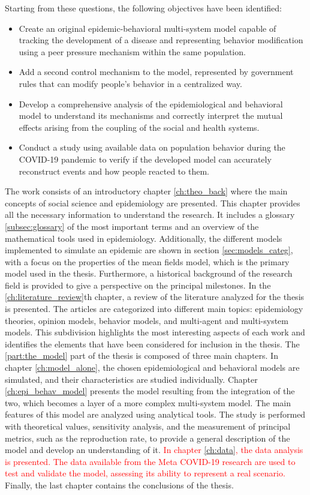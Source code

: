 Starting from these questions, the following objectives have been identified:
\begin{itemize}
	\item Create an original epidemic-behavioral multi-system model capable of tracking the development of a disease and representing behavior modification using a peer pressure mechanism within the same population.
	\item Add a second control mechanism to the model, represented by government rules that can modify people's behavior in a centralized way.
	\item Develop a comprehensive analysis of the epidemiological and behavioral model to understand its mechanisms and correctly interpret the mutual effects arising from the coupling of the social and health systems.
	\item Conduct a study using available data on population behavior during the COVID-19 pandemic to verify if the developed model can accurately reconstruct events and how people reacted to them.
\end{itemize}
The work consists of an introductory chapter \ref{ch:theo_back} where the main concepts of social science and epidemiology are presented. This chapter provides all the necessary information to understand the research. It includes a glossary \ref{subsec:glossary} of the most important terms and an overview of the mathematical tools used in epidemiology. Additionally, the different models implemented to simulate an epidemic are shown in section \ref{sec:models_categ}, with a focus on the properties of the mean fields model, which is the primary model used in the thesis. Furthermore, a historical background of the research field is provided to give a perspective on the principal milestones.
In the \ref{ch:literature_review}th chapter, a review of the literature analyzed for the thesis is presented. The articles are categorized into different main topics: epidemiology theories, opinion models, behavior models, and multi-agent and multi-system models. This subdivision highlights the most interesting aspects of each work and identifies the elements that have been considered for inclusion in the thesis.
The \ref{part:the_model} part of the thesis is composed of three main chapters. In chapter \ref{ch:model_alone}, the chosen epidemiological and behavioral models are simulated, and their characteristics are studied individually. Chapter \ref{ch:epi_behav_model} presents the model resulting from the integration of the two, which becomes a layer of a more complex multi-system model. The main features of this model are analyzed using analytical tools. The study is performed with theoretical values, sensitivity analysis, and the measurement of principal metrics, such as the reproduction rate, to provide a general description of the model and develop an understanding of it.
\textcolor{red}{In chapter \ref{ch:data}, the data analysis is presented. The data available from the Meta COVID-19 research are used to test and validate the model, assessing its ability to represent a real scenario.} Finally, the last chapter contains the conclusions of the thesis.
 

